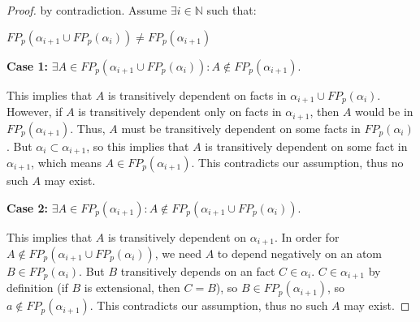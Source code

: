 \begin{proof}



by contradiction. Assume $\exists i \in \mathbb{N}$ such that:

$FP_p(\alpha_{i+1} \cup FP_p(\alpha_i)) \neq FP_p(\alpha_{i+1})$

{\bf Case 1:} $\exists A \in FP_p(\alpha_{i+1} \cup FP_p(\alpha_i)) : A \not\in FP_p(\alpha_{i+1}).$

This implies that $A$ is transitively dependent on facts in $\alpha_{i+1} \cup
FP_p(\alpha_i)$.  However, if $A$ is transitively dependent only on facts in
$\alpha_{i+1}$, then $A$ would be in $FP_p(\alpha_{i+1})$.  Thus, $A$ must be
transitively dependent on some facts in $FP_p(\alpha_{i})$.  But $\alpha_{i}
\subset \alpha_{i+1}$, so this implies that $A$ is transitively dependent on
some fact in $\alpha_{i+1}$, which means $A \in FP_p(\alpha_{i+1})$.  This
contradicts our assumption, thus no such $A$ may exist.

{\bf Case 2:} $\exists A \in FP_p(\alpha_{i+1}) : A \not\in FP_p(\alpha_{i+1} \cup FP_p(\alpha_i)).$

This implies that $A$ is transitively dependent on $\alpha_{i+1}$.  In order
for $A \not\in FP_p(\alpha_{i+1} \cup FP_p(\alpha_i))$, we need $A$ to depend
negatively on an atom $B \in FP_p(\alpha_i)$.  But $B$ transitively depends on
an fact $C \in \alpha_i$.  $C \in \alpha_{i+1}$ by definition (if $B$ is
extensional, then $C=B$), so $B \in FP_p(\alpha_{i+1})$, so $a \not\in
FP_p(\alpha_{i+1})$.  This contradicts our assumption, thus no such $A$ may
exist.




\end{proof}

